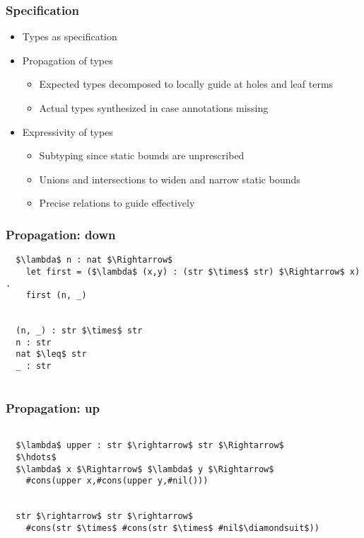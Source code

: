 \documentclass{beamer}
\begin{document}
\begin{frame}[fragile]
  \frametitle{Specification}
  \begin{itemize}
  \item Types as specification 
  \item Propagation of types   
    \begin{itemize}
    \item Expected types decomposed to locally guide at holes and leaf terms   
    \item Actual types synthesized in case annotations missing 
    \end{itemize}

  \item Expressivity of types    
    \begin{itemize}
    \item Subtyping since static bounds are unprescribed 
    \item Unions and intersections to widen and narrow static bounds 
    \item Precise relations to guide effectively   
    \end{itemize}
  \end{itemize}
\end{frame}

\begin{frame}[fragile]
  \frametitle{Propagation: down}

  \begin{lstlisting}
  $\lambda$ n : nat $\Rightarrow$
    let first = ($\lambda$ (x,y) : (str $\times$ str) $\Rightarrow$ x) .
    first (n, _) 

    
  (n, _) : str $\times$ str
  n : str   
  nat $\leq$ str 
  _ : str  
    

  \end{lstlisting}

\end{frame}

\begin{frame}[fragile]
  \frametitle{Propagation: up}

  \begin{lstlisting}

  $\lambda$ upper : str $\rightarrow$ str $\Rightarrow$
  $\hdots$
  $\lambda$ x $\Rightarrow$ $\lambda$ y $\Rightarrow$
    #cons(upper x,#cons(upper y,#nil()))


  str $\rightarrow$ str $\rightarrow$
    #cons(str $\times$ #cons(str $\times$ #nil$\diamondsuit$))

  \end{lstlisting}

\end{frame}
\end{document}

